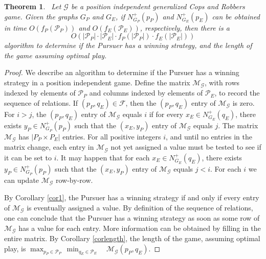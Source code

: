 \documentclass[12pt,reqno]{amsart}
\newtheorem{theorem}{Theorem}
\begin{document}
\smallskip
\begin{theorem}~\label{complexity}
Let $\mathcal{G}$ be a position independent generalized Cops and Robbers game. Given the graphs $G_P$ and $G_E$, if $N^+_{G_P}(p_P)$ and $N^+_{G_E}(p_E)$ can be obtained in time
$O(f_P(\mathcal{P}_P))$ and $O(f_E(\mathcal{P}_E))$, respectively, then there is a $$O(|\mathcal{P}_P| \cdot |\mathcal{P}_E|  \cdot f_P(|\mathcal{P}_P|)  \cdot f_E(|\mathcal{P}_E|))$$ algorithm to
determine if the Pursuer has a winning strategy, and the length of the game assuming optimal play. \label{PolyTime}
\end{theorem}

\begin{proof}
We describe an algorithm to determine if the Pursuer has a winning strategy in a position independent game.  Define the matrix $\mathcal{M}_{\mathcal{G}}$, with rows indexed by elements of
$\mathcal{P}_P$ and columns indexed by elements of $\mathcal{P}_E$, to record the sequence of relations.  If $(p_P, q_E) \in \mathcal{F}$, then the  $(p_P, q_E)$ entry of $\mathcal{M}_{\mathcal{G}}$
is zero.  For $i > j$, the $(p_P, q_E)$ entry of $\mathcal{M}_{\mathcal{G}}$ equals $i$ if for every $x_E \in N^+_{G_E}(q_E)$, there exists $y_P \in N^+_{G_P}(p_P)$ such that the $(x_E, y_P)$ entry
of $\mathcal{M}_{\mathcal{G}}$ equals $j$. The matrix $\mathcal{M}_{\mathcal{G}}$ has $|P_P \times P_E|$ entries.  For all positive integers $i$, and until no entries in the matrix change, each entry
in $\mathcal{M}_{\mathcal{G}}$ not yet assigned a value must be tested to see if it can be set to $i$.  It may happen that for each $x_E \in N^+_{G_E}(q_E)$, there exists $y_P \in N^+_{G_P}(p_P)$
such that the $(x_E, y_P)$ entry of $\mathcal{M}_{\mathcal{G}}$ equals $j < i$.  For each $i$ we can update $\mathcal{M}_{\mathcal{G}}$ row-by-row.

By Corollary \ref{cor1}, the Pursuer has a winning strategy if and only if every entry of $\mathcal{M}_{\mathcal{G}}$ is eventually assigned a value.  By definition of the sequence of relations, one
can conclude that the Pursuer has a winning strategy as soon as some row of $\mathcal{M}_{\mathcal{G}}$ has a value for each entry.  More information can be obtained by filling in the entire matrix.
By Corollary \ref{corlength}, the length of the game, assuming optimal play, is $\max_{p_P \in \mathcal{P}_P} \,\min_{q_E \in \mathcal{P}_E}\quad \mathcal{M}_{\mathcal{G}}(p_P, q_E).$


\end{proof}
\end{document}
